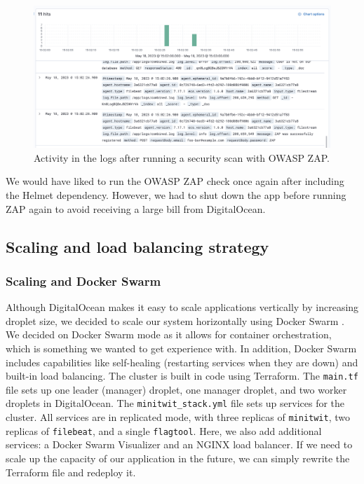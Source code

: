 \begin{figure}[H]
    \centering
    \includegraphics[width=\linewidth]{images/kibana-zap-logs.png}
    \caption{Activity in the logs after running a security scan with OWASP ZAP.}
    \label{fig:kibana-logs-zap}
\end{figure}


We would have liked to run the OWASP ZAP check once again after including the Helmet dependency. However, we had to shut down the app before running ZAP again to avoid receiving a large bill from DigitalOcean. 


\subsection{Scaling and load balancing strategy}
\subsubsection{Scaling and Docker Swarm}
Although DigitalOcean makes it easy to scale applications vertically by increasing droplet size, we decided to scale our system horizontally using Docker Swarm \cite{docker_swarm}. We decided on Docker Swarm mode as it allows for container orchestration, which is something we wanted to get experience with. In addition, Docker Swarm includes capabilities like self-healing (restarting services when they are down) and built-in load balancing. The cluster is built in code using Terraform\cite{terraform}. The \texttt{main.tf} file sets up one leader (manager) droplet, one manager droplet, and two worker droplets in DigitalOcean. The \texttt{minitwit\_stack.yml} file sets up services for the cluster. All services are in replicated mode, with three replicas of \texttt{minitwit}, two replicas of \texttt{filebeat}, and a single \texttt{flagtool}. Here, we also add additional services: a Docker Swarm Visualizer and an NGINX load balancer. If we need to scale up the capacity of our application in the future, we can simply rewrite the Terraform file and redeploy it.

